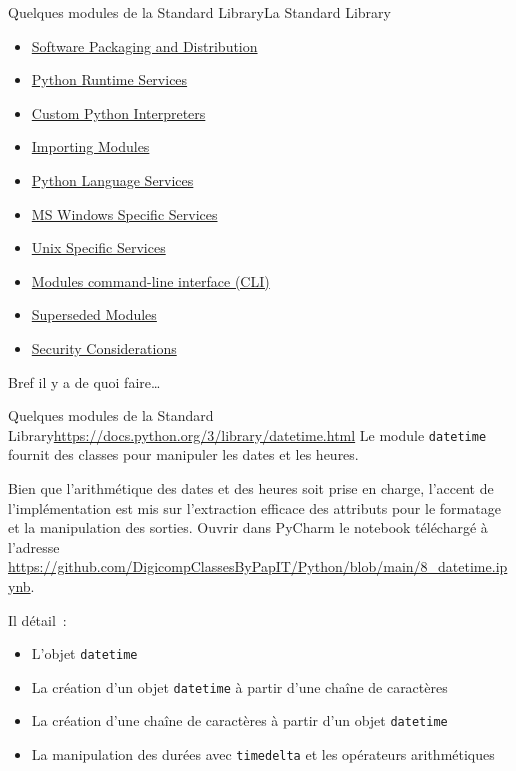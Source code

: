 \documentclass{beamer}
\begin{document}
    \begin{frame}{Quelques modules de la Standard Library}{La Standard Library}
        \begin{itemize}
            \item \href{https://docs.python.org/3/library/distribution.html}{Software Packaging and Distribution}
            \item \href{https://docs.python.org/3/library/python.html}{Python Runtime Services}
            \item \href{https://docs.python.org/3/library/custominterp.html}{Custom Python Interpreters}
            \item \href{https://docs.python.org/3/library/modules.html}{Importing Modules}
            \item \href{https://docs.python.org/3/library/language.html}{Python Language Services}
            \item \href{https://docs.python.org/3/library/windows.html}{MS Windows Specific Services}
            \item \href{https://docs.python.org/3/library/unix.html}{Unix Specific Services}
            \item \href{https://docs.python.org/3/library/cmdline.html}{Modules command-line interface (CLI)}
            \item \href{https://docs.python.org/3/library/superseded.html}{Superseded Modules}
            \item \href{https://docs.python.org/3/library/security_warnings.html}{Security Considerations}
        \end{itemize}
        \bigbreak
        Bref il y a de quoi faire\ldots
    \end{frame}

    \begin{frame}{Quelques modules de la Standard Library}{\href{datetime}{https://docs.python.org/3/library/datetime.html}}
        Le module \lstinline{datetime} fournit des classes pour manipuler les dates et les heures.

        Bien que l'arithmétique des dates et des heures soit prise en charge, l'accent de l'implémentation est mis sur l'extraction efficace des attributs pour le formatage et la manipulation des sorties.
        \bigbreak
        Ouvrir dans PyCharm le notebook téléchargé à l'adresse \url{https://github.com/DigicompClassesByPapIT/Python/blob/main/8_datetime.ipynb}.

        Il détail~:
        \begin{itemize}
            \item L'objet \lstinline{datetime}
            \item La création d'un objet \lstinline{datetime} à partir d'une chaîne de caractères
            \item La création d'une chaîne de caractères à partir d'un objet \lstinline{datetime}
            \item La manipulation des durées avec \lstinline{timedelta} et les opérateurs arithmétiques
        \end{itemize}
    \end{frame}
\end{document}
